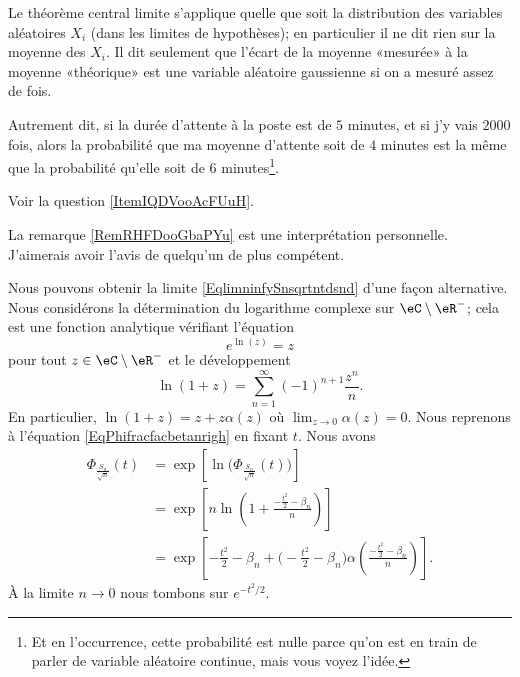 \begin{remark}  \label{RemRHFDooGbaPYu}

    Le théorème central limite s'applique quelle que soit la distribution des variables aléatoires \( X_i\) (dans les limites de hypothèses); en particulier il ne dit rien sur la moyenne des \( X_i\). Il dit seulement que l'écart de la moyenne «mesurée»  à la moyenne «théorique» est une variable aléatoire gaussienne si on a mesuré assez de fois.

    Autrement dit, si la durée d'attente à la poste est de \( 5\) minutes, et si j'y vais \( 2000\) fois, alors la probabilité que ma moyenne d'attente soit de \( 4\) minutes est la même que la probabilité qu'elle soit de \( 6\) minutes\footnote{Et en l'occurrence, cette probabilité est nulle parce qu'on est en train de parler de variable aléatoire continue, mais vous voyez l'idée.}.

    Voir la question \ref{ItemIQDVooAcFUuH}.
    
\end{remark}

    \begin{probleme}
        La remarque \ref{RemRHFDooGbaPYu} est une interprétation personnelle. J'aimerais avoir l'avis de quelqu'un de plus compétent.
    \end{probleme}


\begin{remark}
    Nous pouvons obtenir la limite \eqref{EqlimninfySnsqrtntdsnd} d'une façon alternative. Nous considérons la détermination du logarithme complexe sur \( \eC\setminus\eR^-\); cela est une fonction analytique vérifiant l'équation
    \begin{equation}
        e^{\ln(z)}=z
    \end{equation}
    pour tout \( z\in\eC\setminus\eR^-\) et le développement
    \begin{equation}
        \ln(1+z)=\sum_{n=1}^{\infty}(-1)^{n+1}\frac{ z^n }{ n }.
    \end{equation}
    En particulier, \( \ln(1+z)=z+z\alpha(z)\) où \( \lim_{z\to 0}\alpha(z)=0\). Nous reprenons à l'équation \eqref{EqPhifracfacbetanrigh} en fixant \( t\). Nous avons
    \begin{subequations}
        \begin{align}
            \Phi_{\frac{ S_n }{ \sqrt{n} }}(t)&=\exp\left[ \ln\big(\Phi_{\frac{ S_n }{ \sqrt{n} }}(t)\big) \right]\\
            &=\exp\left[ n\ln\left( 1+\frac{ -\frac{ t^2 }{2}-\beta_n }{ n } \right) \right]\\
            &=\exp\left[ -\frac{ t^2 }{2}-\beta_n+ \big( -\frac{ t^2 }{2}-\beta_n \big)\alpha\left( \frac{ -\frac{ t^2 }{2}-\beta_n }{ n } \right) \right].
        \end{align}
    \end{subequations}
    À la limite \( n\to 0\) nous tombons sur \(  e^{-t^2/2}\).
    
\end{remark}

